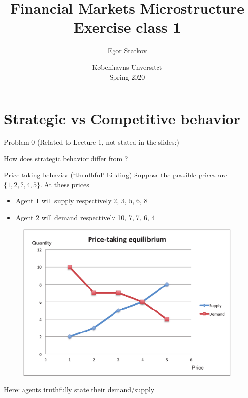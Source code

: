 




\title{Financial Markets Microstructure \\ Exercise class 1}

\author{Egor Starkov}

\date{K{\o}benhavns Unversitet \\
	Spring 2020}




\frame[plain]{\titlepage}
\addtocounter{framenumber}{-1}



\section{Strategic vs Competitive behavior}

\begin{frame}{Problem 0}
	(Related to Lecture 1, not stated in the slides:)
	
	How does \alert{strategic} behavior differ from ?
\end{frame}


\begin{frame}{Price-taking behavior (`thruthful' bidding)}
	Suppose the possible prices are $\{1,2,3,4,5\}$. At these prices:
	\begin{itemize}
		\item Agent 1 will supply respectively 2, 3, 5, 6, 8
		\item Agent 2 will demand respectively 10, 7, 7, 6, 4
	\end{itemize}
	\begin{figure}
		\includegraphics[width=.4\paperwidth]{pics/Image_PriceTaking2}
	\end{figure}
	Here: agents truthfully state their demand/supply
\end{frame}


